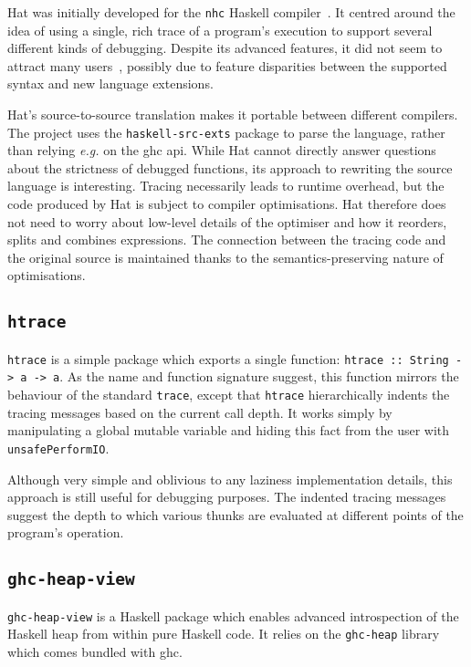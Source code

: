 \documentclass[thesis=B,english]{FITthesis}[2019/12/23]
\newcommand{\eg}{\emph{e.g.}\xspace}
\newcommand{\hackage}[1]{\texttt{#1}}
\newcommand{\hsIdent}[1]{\texttt{#1}}
\newcommand{\hsCode}[1]{\texttt{#1}}
\begin{document}
Hat was initially developed for the \texttt{nhc} Haskell
compiler~\cite{hat-history}. It centred around the idea of using a single, rich
trace of a program's execution to support several different kinds of debugging.
Despite its advanced features, it did not seem to attract many
users~\cite{hat-history}, possibly due to feature disparities between the
supported syntax and new language extensions.

Hat's source-to-source translation makes it portable between different
compilers. The project uses the \hackage{haskell-src-exts} package to parse the
language, rather than relying \eg on the \acrshort{ghc} \acrshort{api}. While
Hat cannot directly answer questions about the strictness of debugged
functions, its approach to rewriting the source language is interesting.
Tracing necessarily leads to runtime overhead, but the code produced by Hat is
subject to compiler optimisations. Hat therefore does not need to worry about
low-level details of the optimiser and how it reorders, splits and combines
expressions. The connection between the tracing code and the original source is
maintained thanks to the semantics-preserving nature of optimisations.


\subsection*{\hackage{htrace}} \label{sec:htrace}
\hackage{htrace} \cite{hkg-htrace} is a simple package which exports a single
function: \hsCode{htrace :: String -> a -> a}. As the name and function
signature suggest, this function mirrors the behaviour of the standard
\hsIdent{trace}, except that \hsIdent{htrace} hierarchically indents the
tracing messages based on the current call depth. It works simply by
manipulating a global mutable variable and hiding this fact from the user with
\hsIdent{unsafePerformIO}.

Although very simple and oblivious to any laziness implementation details, this
approach is still useful for debugging purposes. The indented tracing messages
suggest the depth to which various thunks are evaluated at different points of
the program's operation.

\subsection*{\hackage{ghc-heap-view}} \label{sec:ghc-heap-view}
\hackage{ghc-heap-view} is a Haskell package which enables advanced
introspection of the Haskell heap from within pure Haskell code. It relies on
the \hackage{ghc-heap} library which comes bundled with \acrshort{ghc}.
\end{document}
